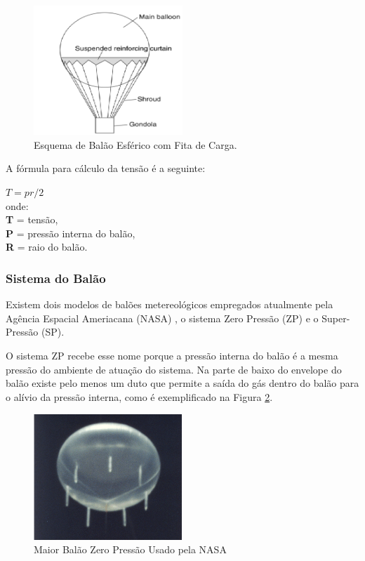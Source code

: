 	\begin{figure}[H]
		\centering
		\includegraphics[width=0.5\textwidth]{figuras/balaoEsferico}
		\caption{Esquema de Balão Esférico com Fita de Carga.}
		\label{img:balaoEsferico}
	\end{figure}

	A fórmula para cálculo da tensão é a seguinte:

	$T = pr/2$ \\
	onde: \\
	\textbf{T} = tensão, \\
	\textbf{P} = pressão interna do balão, \\
	\textbf{R} = raio do balão. \\

\subsubsection{Sistema do Balão}

	Existem dois modelos de balões metereológicos empregados atualmente pela Agência Espacial Ameriacana (NASA) , o sistema Zero Pressão (ZP) e o Super-Pressão (SP).

	O sistema ZP recebe esse nome porque a pressão interna do balão é a mesma  pressão do ambiente de atuação do sistema. Na parte de baixo do envelope do balão existe pelo menos um duto que permite a saída do gás dentro do balão para o alívio da pressão interna, como é exemplificado na Figura \ref{img:maiorBalaoZeroPressao}.

	\begin{figure}[H]
		\centering
		\includegraphics[width=0.5\textwidth]{figuras/maiorBalaoZeroPressao}
		\caption[Maior Balão Zero Pressão Usado pela NASA]{Maior Balão Zero Pressão Usado pela NASA~\cite{nasa1}}
		\label{img:maiorBalaoZeroPressao}
	\end{figure}

